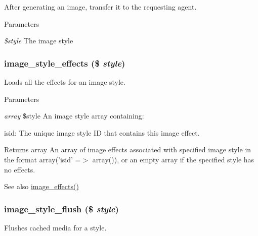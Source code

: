 After generating an image, transfer it to the requesting agent.


\begin{DoxyParams}{Parameters}
\item[{\em \$style}]The image style \end{DoxyParams}
\hypertarget{image_8module_a5bc8f07cdbaa380732137a12020877da}{
\subsubsection[{image\_\-style\_\-effects}]{\setlength{\rightskip}{0pt plus 5cm}image\_\-style\_\-effects (\$ {\em style})}}
\label{image_8module_a5bc8f07cdbaa380732137a12020877da}
Loads all the effects for an image style.


\begin{DoxyParams}{Parameters}
\item[{\em array}]\$style An image style array containing:
\begin{DoxyItemize}
\item isid: The unique image style ID that contains this image effect.
\end{DoxyItemize}\end{DoxyParams}
\begin{DoxyReturn}{Returns}
array An array of image effects associated with specified image style in the format array('isid' =$>$ array()), or an empty array if the specified style has no effects. 
\end{DoxyReturn}
\begin{DoxySeeAlso}{See also}
\hyperlink{image_8module_ae0237054a43c19118bf13e609e5cff8b}{image\_\-effects()} 
\end{DoxySeeAlso}
\hypertarget{image_8module_a18ea35a0e02f61a447a0851b78e1e556}{
\subsubsection[{image\_\-style\_\-flush}]{\setlength{\rightskip}{0pt plus 5cm}image\_\-style\_\-flush (\$ {\em style})}}
\label{image_8module_a18ea35a0e02f61a447a0851b78e1e556}
Flushes cached media for a style.


